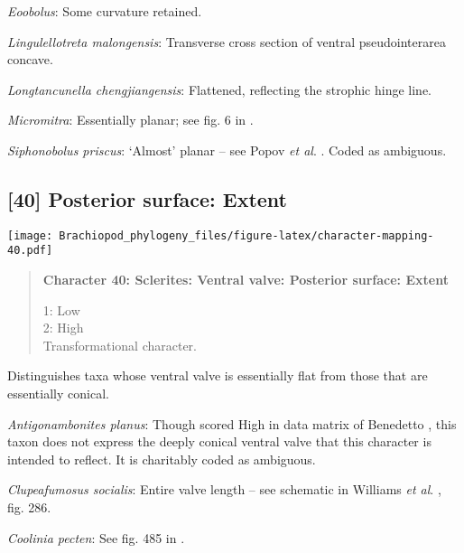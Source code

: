 \documentclass[openany]{book}
\theoremstyle{definition}
\theoremstyle{definition}
\theoremstyle{definition}
\theoremstyle{remark}
\begin{document}
\hypertarget{Eoobolus-coding-39}{}
\emph{Eoobolus}: Some curvature retained.

\hypertarget{Lingulellotreta_malongensis-coding-39}{}
\emph{Lingulellotreta malongensis}: Transverse cross section of ventral
pseudointerarea concave.

\hypertarget{Longtancunella_chengjiangensis-coding-39}{}
\emph{Longtancunella chengjiangensis}: Flattened, reflecting the
strophic hinge line.

\hypertarget{Micromitra-coding-39}{}
\emph{Micromitra}: Essentially planar; see fig. 6 in
\citet{Ushatinskaya2016Protegulumand}.

\hypertarget{Siphonobolus_priscus-coding-39}{}
\emph{Siphonobolus priscus}: `Almost' planar -- see Popov \emph{et al}.
\citeyearpar[fig. 4]{Popov2009Earlyontogeny}. Coded as ambiguous.

\subsection*{{[}40{]} Posterior surface:
Extent}\label{posterior-surface-extent}

\texttt{[image: Brachiopod\_phylogeny\_files/figure-latex/character-mapping-40.pdf]}

\begin{quote}
\textbf{Character 40: Sclerites: Ventral valve: Posterior surface:
Extent}

1: Low\\
2: High\\
Transformational character.
\end{quote}

Distinguishes taxa whose ventral valve is essentially flat from those
that are essentially conical.

\hypertarget{Antigonambonites_planus-coding-40}{}
\emph{Antigonambonites planus}: Though scored High in data matrix of
Benedetto \citeyearpar{Benedetto2009iChaniella}, this taxon
\citep[see][fig. 508]{Williams2000LinguliformeaCraniiformea} does not
express the deeply conical ventral valve that this character is intended
to reflect. It is charitably coded as ambiguous.

\hypertarget{Clupeafumosus_socialis-coding-40}{}
\emph{Clupeafumosus socialis}: Entire valve length -- see schematic in
Williams \emph{et al}. \citeyearpar{Williams1997Introduction}, fig. 286.

\hypertarget{Coolinia_pecten-coding-40}{}
\emph{Coolinia pecten}: See fig. 485 in
\citet{Williams2000LinguliformeaCraniiformea}.
\end{document}
